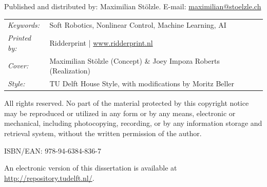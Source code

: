 \begin{titlepage}
\noindent Published and distributed by: Maximilian Stölzle. E-mail: \href{mailto:maximilian@stoelzle.ch}{maximilian@stoelzle.ch}\\

\noindent
\begin{tabular}{@{}p{}@{}p{}}
  \textit{Keywords:} & Soft Robotics, Nonlinear Control, Machine Learning, AI \\[\medskipamount]
      \textit{Printed by:} & Ridderprint | \url{www.ridderprint.nl} \\[\medskipamount]
      \textit{Cover:} & Maximilian Stölzle (Concept) \& Joey Impoza Roberts (Realization) \\[\medskipamount]
      \textit{Style:} & TU Delft House Style, with modifications by Moritz Beller \\[\medskipamount] %
\end{tabular}

\medskip
\medskip
\noindent All rights reserved. No part of the material protected by this copyright notice may be reproduced or utilized in any form or by any means, electronic or mechanical, including photocopying, recording, or by any information storage and retrieval system, without the written permission of the author.

\vspace{\bigskipamount}



\noindent ISBN/EAN: 978-94-6384-836-7

\medskip
\noindent An electronic version of this dissertation is available at \\
\url{http://repository.tudelft.nl/}.

\end{titlepage}

